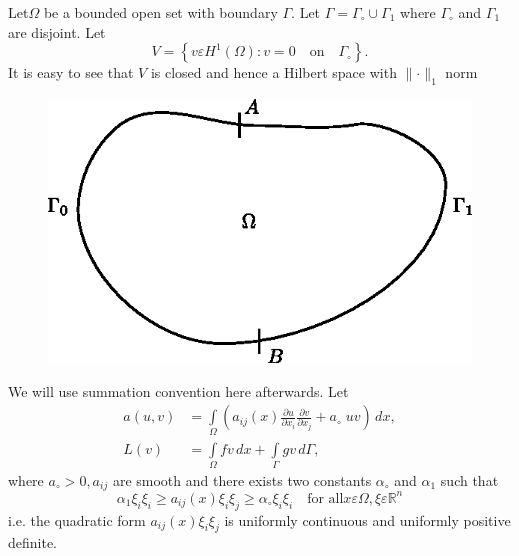 Let\pageoriginale $\Omega$ be a bounded open set with boundary
$\Gamma$. Let $\Gamma =\Gamma_\circ \cup \Gamma_1$ where
$\Gamma_\circ$ and $\Gamma_1$ are disjoint. Let
\begin{equation}\label{chap2:eq2.20}
V=\left\{v\varepsilon H^1(\Omega):v=0\quad\text{on}\quad\Gamma_\circ\right\}.
\end{equation}
It is easy to see that $V$ is closed and hence a Hilbert space with
$\parallel \cdotp\parallel_1$ norm 
\begin{figure}[H]
\centering
\includegraphics{figure/fig2.1.eps}
\caption{}\label{fig2.1}
\end{figure}

We will use summation convention here afterwards. Let 
\begin{align}\label{chap2:eq2.21}
a(u, v) &= \int\limits_\Omega\left(a_{ij}(x)\frac{\partial u} {\partial
  x_i} \frac{\partial v}{\partial x_j}+a_\circ \; uv\right)\,dx,\\
L(v) &= \int\limits_\Omega fv \,dx +\int\limits_\Gamma
gv\,d\Gamma, \label{chap2:eq2.22} 
\end{align}
where $a_\circ >0, a_{ij}$ are smooth and there exists two constants
$\alpha_\circ$ and $\alpha_1$ such that 
\begin{equation}\label{chap2:eq2.23}
\alpha_1 \xi_i\xi_i\geq a_{ij}(x)\xi_i\xi_j\geq\alpha_\circ\xi_i\xi_i
\quad\text{for all} x\varepsilon\Omega, \xi \varepsilon \mathbb{R}^n
\end{equation}
i.e. the quadratic form $a_{ij}(x)\xi_i\xi_j$ is uniformly continuous
and uniformly positive definite.

